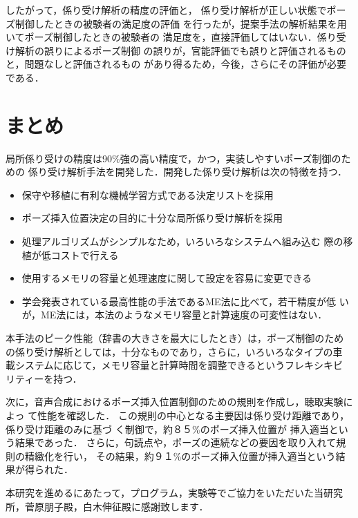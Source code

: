    したがって，係り受け解析の精度の評価と，
   係り受け解析が正しい状態でポーズ制御したときの被験者の満足度の評価
   を行ったが，提案手法の解析結果を用いてポーズ制御したときの被験者の
   満足度を，直接評価してはいない．係り受け解析の誤りによるポーズ制御
   の誤りが，官能評価でも誤りと評価されるものと，問題なしと評価されるもの
   があり得るため，今後，さらにその評価が必要である．

\section{まとめ}

局所係り受けの精度は90\%強の高い精度で，かつ，実装しやすいポーズ制御のための
係り受け解析手法を開発した．開発した係り受け解析は次の特徴を持つ．
\begin{itemize}
  \item 保守や移植に有利な機械学習方式である決定リストを採用
  \item ポーズ挿入位置決定の目的に十分な局所係り受け解析を採用
  \item 処理アルゴリズムがシンプルなため，いろいろなシステムへ組み込む
	際の移植が低コストで行える
  \item 使用するメモリの容量と処理速度に関して設定を容易に変更できる

  \item 学会発表されている最高性能の手法であるME法に比べて，若干精度が低
     いが，ME法には，本法のようなメモリ容量と計算速度の可変性はない．
\end{itemize}

本手法のピーク性能（辞書の大きさを最大にしたとき）は，ポーズ制御のため
の係り受け解析としては，十分なものであり，さらに，いろいろなタイプの車
載システムに応じて，メモリ容量と計算時間を調整できるというフレキシキビ
リティーを持つ．

次に，音声合成におけるポーズ挿入位置制御のための規則を作成し，聴取実験によっ
て性能を確認した．
この規則の中心となる主要因は係り受け距離であり，係り受け距離のみに基づ
く制御で，約８５\%のポーズ挿入位置が
挿入適当という結果であった．
さらに，句読点や，ポーズの連続などの要因を取り入れて規則の精緻化を行い，
その結果，約９１\%のポーズ挿入位置が挿入適当という結果が得られた．

\acknowledgment

本研究を進めるにあたって，プログラム，実験等でご協力をいただいた当研究
所，菅原朋子殿，白木伸征殿に感謝致します．





